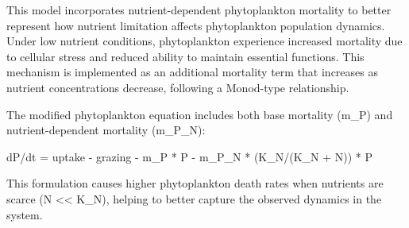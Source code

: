 This model incorporates nutrient-dependent phytoplankton mortality to better represent how nutrient limitation affects phytoplankton population dynamics. Under low nutrient conditions, phytoplankton experience increased mortality due to cellular stress and reduced ability to maintain essential functions. This mechanism is implemented as an additional mortality term that increases as nutrient concentrations decrease, following a Monod-type relationship.

The modified phytoplankton equation includes both base mortality (m_P) and nutrient-dependent mortality (m_P_N):

dP/dt = uptake - grazing - m_P * P - m_P_N * (K_N/(K_N + N)) * P

This formulation causes higher phytoplankton death rates when nutrients are scarce (N << K_N), helping to better capture the observed dynamics in the system.
